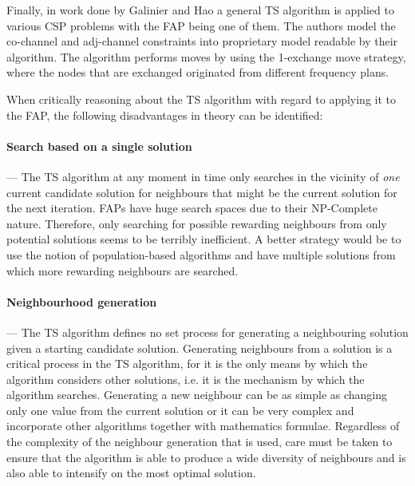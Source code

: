 Finally, in work done by Galinier and Hao\cite{TSCSP} a general TS algorithm is applied to various CSP problems with the FAP being one of them. The authors model the co-channel and adj-channel constraints into proprietary model readable by their algorithm. The algorithm performs moves by using the 1-exchange move strategy, where the nodes that are exchanged originated from different frequency plans\cite{TSCSP}.

When critically reasoning about the \gls{TS} algorithm with regard to applying it to the \gls{FAP}, the following disadvantages in theory can be identified:
\paragraph{Search based on a single solution}
--- The \gls{TS} algorithm at any moment in time only searches in the vicinity of \emph{one} current candidate solution for neighbours that might be the current solution for the next iteration. \gls{FAP}s have huge search spaces due to their NP-Complete nature. Therefore, only searching for possible rewarding neighbours from only potential solutions seems to be terribly inefficient. A better strategy would be to use the notion of population-based algorithms and have multiple solutions from which more rewarding neighbours are searched.
\paragraph{Neighbourhood generation}
--- The \gls{TS} algorithm defines no set process for generating a neighbouring solution given a starting candidate solution. Generating neighbours from a solution is a critical process in the \gls{TS} algorithm, for it is the only means by which the algorithm considers other solutions, i.e. it is the mechanism by which the algorithm searches. Generating a new neighbour can be as simple as changing only one value from the current solution or it can be very complex and incorporate other algorithms together with mathematics formulae. Regardless of the complexity of the neighbour generation that is used, care must be taken to ensure that the algorithm is able to produce a wide diversity of neighbours and is also able to intensify on the most optimal solution.
